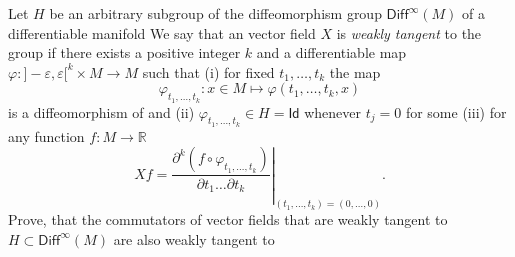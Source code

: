 Let $ H$ be an arbitrary subgroup of the diffeomorphism group $ \mathsf{Diff}^\infty(M)$ of a differentiable manifold  We say that an vector field $ X$ is \textit{weakly tangent} to the group  if there exists a positive integer $ k$ and a differentiable map $ \varphi \mathrel{: } \mathord{]} - \varepsilon,\varepsilon\mathord{[}^k\times M\to M$ such that
(i) for fixed $ t_1,\dots,t_k$ the map
\[ \varphi_{t_1,\dots,t_k} : x\in M\mapsto \varphi(t_1,\dots,t_k,x)\]
is a diffeomorphism of  and 
(ii) $ \varphi_{t_1,\dots,t_k}\in H = \mathsf{Id}$ whenever $ t_j = 0$ for some 
(iii) for any function $ f: M\to \mathbb R$
\[ X f = \left.\frac {\partial^k(f\circ\varphi_{t_1,\dots,t_k})}{\partial t_1\dots\partial t_k}\right|_{(t_1,\dots,t_k) = (0,\dots,0)}.\]
Prove, that the commutators of vector fields that are weakly tangent to $ H\subset \textsf{Diff}^\infty(M)$ are also weakly tangent to 